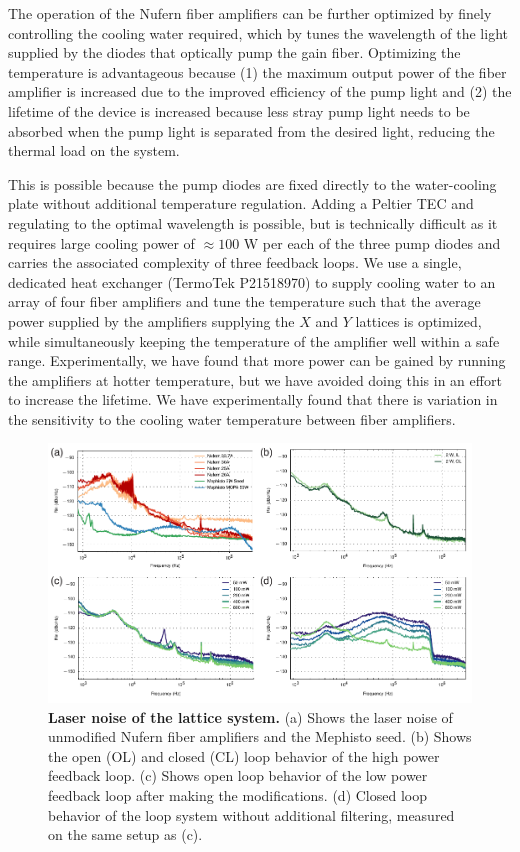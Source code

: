 \documentclass[twocolumn,aps,pra,showpacs,preprintnumbers,bibnotes]{revtex4-1}
\begin{document}
The operation of the Nufern fiber amplifiers can be further optimized by finely controlling the cooling water required, which by tunes the wavelength of the light supplied by the diodes that optically pump the gain fiber.
Optimizing the temperature is advantageous because (1) the maximum output power of the fiber amplifier is increased due to the improved efficiency of the pump light and (2) the lifetime of the device is increased because less stray pump light needs to be absorbed when the pump light is separated from the desired light, reducing the thermal load on the system.

This is possible because the pump diodes are fixed directly to the water-cooling plate without additional temperature regulation.
Adding a Peltier TEC and regulating to the optimal wavelength is possible, but is technically difficult as it requires large cooling power of $\approx100$ W per each of the three pump diodes and carries the associated complexity of three feedback loops.
We use a single, dedicated heat exchanger (TermoTek P21518970) to supply cooling water to an array of four fiber amplifiers and tune the temperature such that the average power supplied by the amplifiers supplying the $X$ and $Y$ lattices is optimized, while simultaneously keeping the temperature of the amplifier well within a safe range.
Experimentally, we have found that more power can be gained by running the amplifiers at hotter temperature, but we have avoided doing this in an effort to increase the lifetime.
We have experimentally found that there is variation in the sensitivity to the cooling water temperature between fiber amplifiers. 

\begin{figure}
  \begin{center}
    \includegraphics{fig/fig3_combined.pdf}
    \caption{\textbf{Laser noise of the lattice system.} (a) Shows the laser noise of unmodified Nufern fiber amplifiers and the Mephisto seed. (b) Shows the open (OL) and closed (CL) loop behavior of the high power feedback loop. (c) Shows open loop behavior of the low power feedback loop after making the modifications. (d) Closed loop behavior of the loop system without additional filtering, measured on the same setup as (c).}\label{fig:noises}
  \end{center}
\end{figure}
\end{document}
